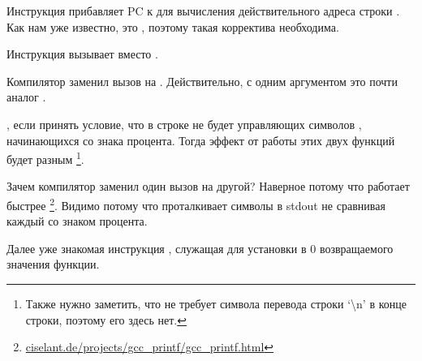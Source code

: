 Инструкция  прибавляет \ac{PC} к  для вычисления действительного адреса строки . Как нам уже известно, это \q{\PICcode}, поэтому такая корректива необходима.

Инструкция  вызывает \puts вместо \printf.

\label{puts}
Компилятор заменил вызов \printf на \puts. 
Действительно, \printf с одним аргументом это почти аналог \puts.
 
, если принять условие, что в строке не будет управляющих символов \printf, 
начинающихся со знака процента. Тогда эффект от работы этих двух функций будет разным
\footnote{Также нужно заметить, что \puts не требует символа перевода строки `\textbackslash{}n' в конце строки,
поэтому его здесь нет.}.

Зачем компилятор заменил один вызов на другой? Наверное потому что \puts работает быстрее
\footnote{\href{http://go.yurichev.com/17063}{ciselant.de/projects/gcc\_printf/gcc\_printf.html}}. 
Видимо потому что \puts проталкивает символы в \gls{stdout} не сравнивая каждый со знаком процента.

Далее уже знакомая инструкция , служащая для установки в 0 возвращаемого значения функции.

